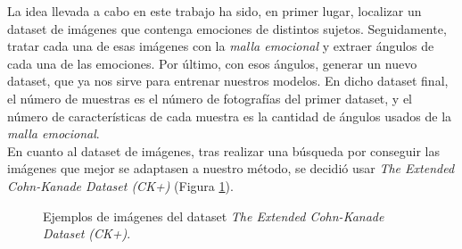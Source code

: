 La idea llevada a cabo en este trabajo ha sido, en primer lugar, localizar un dataset de imágenes que contenga emociones de distintos sujetos. Seguidamente, tratar cada una de esas imágenes con la \textit{malla emocional} y extraer ángulos de cada una de las emociones. Por último, con esos ángulos, generar un nuevo dataset, que ya nos sirve para entrenar nuestros modelos. En dicho dataset final, el número de muestras es el número de fotografías del primer dataset, y el número de características de cada muestra es la cantidad de ángulos usados de la \textit{malla emocional}.\\

En cuanto al dataset de imágenes, tras realizar una búsqueda por conseguir las imágenes que mejor se adaptasen a nuestro método, se decidió usar \textit{The Extended Cohn-Kanade Dataset (CK+)}\cite{Kanade1}\cite{Kanade2} (Figura \ref{fig:ejemplosCK}). \\

\begin{figure}[h!]
  \begin{center}
    \subcapcentertrue
  \end{center}
\captionsetup{justification=centering}
\caption{Ejemplos de imágenes del dataset \textit{The Extended Cohn-Kanade Dataset (CK+)}.}
\label{fig:ejemplosCK}
\end{figure}

